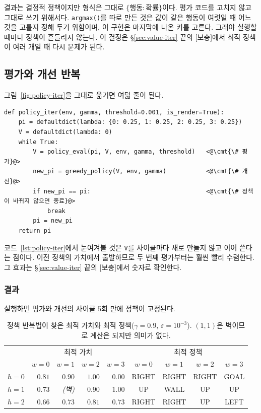 \documentclass[11pt,a4paper]{article}
\newcommand{\cmt}[1]{\textcolor{codecm}{#1}}   %
\begin{document}
결과는 결정적 정책이지만 형식은 그대로 $\{\text{행동}:\text{확률}\}$이다. 평가 코드를 고치지 않고
그대로 쓰기 위해서다. \lstinline|argmax()|를 따로 만든 것은 값이 같은 행동이 여럿일 때 어느 것을
고를지 정해 두기 위함이며, 이 구현은 마지막에 나온 키를 고른다. 그래야 실행할 때마다 정책이 흔들리지
않는다. 이 결정은 \S\ref{sec:value-iter} 끝의 [보충]에서 최적 정책이 여러 개일 때 다시 문제가 된다.

\subsection{평가와 개선 반복}
\label{sec:policy-iter-code}

그림~\ref{fig:policy-iter}을 그대로 옮기면 여덟 줄이 된다.

\begin{lstlisting}[caption={정책 반복법 (\texttt{s05\_policy\_iter.py})},label={lst:policy-iter}]
def policy_iter(env, gamma, threshold=0.001, is_render=True):
    pi = defaultdict(lambda: {0: 0.25, 1: 0.25, 2: 0.25, 3: 0.25})
    V = defaultdict(lambda: 0)
    while True:
        V = policy_eval(pi, V, env, gamma, threshold)   <@\cmt{\# 평가}@>
        new_pi = greedy_policy(V, env, gamma)           <@\cmt{\# 개선}@>
        if new_pi == pi:                                <@\cmt{\# 정책이 바뀌지 않으면 종료}@>
            break
        pi = new_pi
    return pi
\end{lstlisting}

코드~\ref{lst:policy-iter}에서 눈여겨볼 것은 \lstinline|V|를 사이클마다 새로 만들지 않고 이어 쓴다는
점이다. 이전 정책의 가치에서 출발하므로 두 번째 평가부터는 훨씬 빨리 수렴한다. 그 효과는
\S\ref{sec:value-iter} 끝의 [보충]에서 숫자로 확인한다.

\subsubsection{결과}

실행하면 평가와 개선의 사이클 5회 만에 정책이 고정된다.

\begin{table}[htbp]
\centering
\caption{정책 반복법이 찾은 최적 가치와 최적 정책($\gamma=0.9$, $\varepsilon=10^{-3}$).
$(1,1)$은 벽이므로 계산은 되지만 의미가 없다.}
\label{tab:policy-iter}
\small
\begin{tabular}{@{}lrrrr|cccc@{}}
\toprule
 & \multicolumn{4}{c|}{최적 가치} & \multicolumn{4}{c}{최적 정책} \\
 & $w=0$ & $w=1$ & $w=2$ & $w=3$ & $w=0$ & $w=1$ & $w=2$ & $w=3$ \\
\midrule
$h=0$ & $0.81$ & $0.90$ & $1.00$ & $0.00$ & RIGHT & RIGHT & RIGHT & GOAL \\
$h=1$ & $0.73$ & \textit{(벽)} & $0.90$ & $1.00$ & UP & WALL & UP & UP \\
$h=2$ & $0.66$ & $0.73$ & $0.81$ & $0.73$ & RIGHT & RIGHT & UP & LEFT \\
\bottomrule
\end{tabular}
\end{table}
\end{document}
